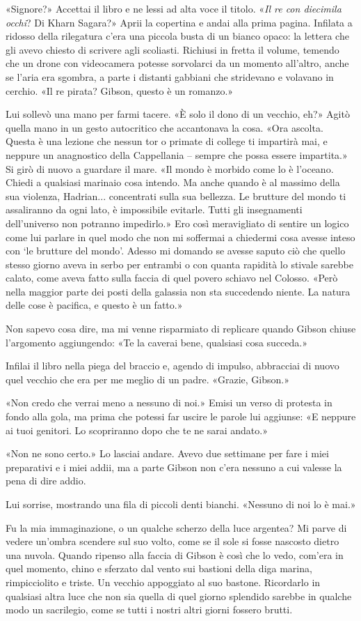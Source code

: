 «Signore?» Accettai il libro e ne lessi ad alta voce il titolo.
«\emph{Il re con diecimila occhi}? Di Kharn Sagara?» Aprii la copertina
e andai alla prima pagina. Infilata a ridosso della rilegatura c'era una
piccola busta di un bianco opaco: la lettera che gli avevo chiesto di
scrivere agli scoliasti. Richiusi in fretta il volume, temendo che un
drone con videocamera potesse sorvolarci da un momento all'altro, anche
se l'aria era sgombra, a parte i distanti gabbiani che stridevano e
volavano in cerchio. «Il re pirata? Gibson, questo è un romanzo.»

Lui sollevò una mano per farmi tacere. «È solo il dono di un vecchio,
eh?» Agitò quella mano in un gesto autocritico che {accantonava} la
cosa. «Ora ascolta. Questa è una lezione che nessun tor o primate di
college ti impartirà mai, e neppure un anagnostico della Cappellania --
sempre che possa essere impartita.» Si girò di nuovo a guardare il mare.
«Il mondo è morbido come lo è l'oceano. Chiedi a qualsiasi marinaio cosa
intendo. Ma anche quando è al massimo della sua violenza, Hadrian...
concentrati sulla sua bellezza. Le brutture del mondo ti assaliranno da
ogni lato, è impossibile evitarle. Tutti gli insegnamenti dell'universo
non potranno impedirlo.» Ero così meravigliato di sentire un logico come
lui parlare in quel modo che non mi soffermai a chiedermi cosa avesse
inteso con `le brutture del mondo'. Adesso mi domando se avesse saputo
ciò che quello stesso giorno aveva in serbo per entrambi o con quanta
rapidità lo stivale sarebbe calato, come aveva fatto sulla faccia di
quel povero schiavo nel Colosso. «Però nella maggior parte dei posti
della galassia non sta succedendo niente. La natura delle cose è
pacifica, e questo è un fatto.»

Non sapevo cosa dire, ma mi venne risparmiato di replicare quando Gibson
chiuse l'argomento aggiungendo: «Te la caverai bene, qualsiasi cosa
succeda.»

Infilai il libro nella piega del braccio e, agendo di impulso,
abbracciai di nuovo quel vecchio che era per me meglio di un padre.
«Grazie, Gibson.»

«Non credo che verrai meno a nessuno di noi.» Emisi un verso di protesta
in fondo alla gola, ma prima che potessi far uscire le parole lui
aggiunse: «E neppure ai tuoi genitori. Lo scopriranno dopo che te ne
sarai andato.»

«Non ne sono certo.» Lo lasciai andare. Avevo due settimane per fare i
miei preparativi e i miei addii, ma a parte Gibson non c'era nessuno a
cui valesse la pena di dire addio.

Lui sorrise, mostrando una fila di piccoli denti bianchi. «Nessuno di
noi lo è mai.»

Fu la mia immaginazione, o un qualche scherzo della luce argentea? Mi
parve di vedere un'ombra scendere sul suo volto, come se il sole si
fosse nascosto dietro una nuvola. Quando ripenso alla faccia di Gibson è
così che lo vedo, com'era in quel momento, chino e sferzato dal vento
sui bastioni della diga marina, rimpicciolito e triste. Un vecchio
appoggiato al suo bastone. Ricordarlo in qualsiasi altra luce che non
sia quella di quel giorno splendido sarebbe in qualche modo un
sacrilegio, come se tutti i nostri altri giorni {fossero} brutti.
